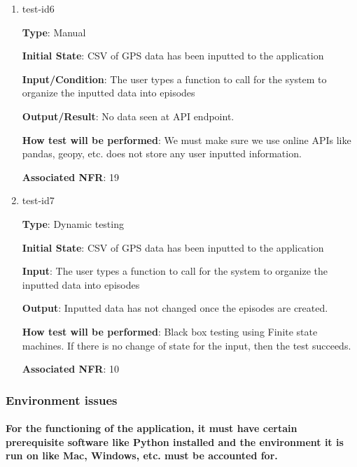 \documentclass[12pt, titlepage]{article}
\begin{document}
\begin{enumerate}

\item{test-id6\\}

\textbf{Type}: Manual
					
\textbf{Initial State}: CSV of GPS data has been inputted to the application
					
\textbf{Input/Condition}: The user types a function to call for the system to organize the
inputted data into episodes
					
\textbf{Output/Result}: No data seen at API endpoint.
					
\textbf{How test will be performed}: We must make sure we use online APIs like pandas, geopy, etc. does not store any user inputted information.

\textbf{Associated NFR}: 19

\item{test-id7\\}

\textbf{Type}: Dynamic testing
					
\textbf{Initial State}: CSV of GPS data has been inputted to the application
					
\textbf{Input}: The user types a function to call for the system to organize the
inputted data into episodes
					
\textbf{Output}: Inputted data has not changed once the episodes are created.
					
\textbf{How test will be performed}: Black box testing using Finite state machines. If there is no change of state for the input, then the test succeeds. 

\textbf{Associated NFR}: 10

\end{enumerate}

\subsubsection{Environment issues}
		
\paragraph{For the functioning of the application, it must have certain prerequisite software like Python installed and the environment it is run on like Mac, Windows, etc. must be accounted for.}
\end{document}
